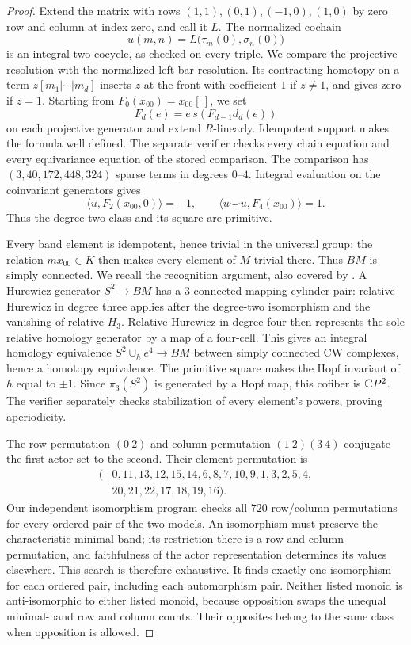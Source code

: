 \begin{proof}
Extend the matrix with rows $(1,1),(0,1),(-1,0),(1,0)$ by zero row and
column at index zero, and call it $L$. The normalized cochain
\[
u(m,n)=L\bigl(\tau_m(0),\sigma_n(0)\bigr)
\]
is an integral two-cocycle, as checked on every triple. We compare the
projective resolution with the normalized left bar resolution. Its
contracting homotopy on a term $z[m_1|\cdots|m_d]$ inserts $z$ at the
front with coefficient $1$ if $z\ne1$, and gives zero if $z=1$.
Starting from $F_0(x_{00})=x_{00}[\,]$, we set
\[
 F_d(e)=e\,s(F_{d-1}d_d(e))
\]
on each projective generator and extend $R$-linearly. Idempotent support
makes the formula well defined. The separate verifier checks every chain
equation and every equivariance equation of the stored comparison.
The comparison has $(3,40,172,448,324)$ sparse terms in degrees $0$--$4$.
Integral evaluation on the coinvariant generators gives
\[
\langle u,F_2(x_{00},0)\rangle=-1,
\qquad \langle u\smile u,F_4(x_{00})\rangle=1.
\]
Thus the degree-two class and its square are primitive.

Every band element is idempotent, hence trivial in the universal group;
the relation $mx_{00}\in K$ then makes every element of $M$ trivial there.
Thus $BM$ is simply connected. We recall the recognition argument, also
covered by \cite[Proposition~4C.3]{CP2-Hatcher2002}. A Hurewicz generator
$S^2\to BM$ has a $3$-connected mapping-cylinder pair: relative
Hurewicz in degree three applies after the degree-two isomorphism and
the vanishing of relative $H_3$. Relative Hurewicz in degree four then
represents the sole relative homology generator by a map of a four-cell.
This gives an integral homology equivalence
$S^2\cup_h e^4\to BM$ between simply connected CW complexes, hence a
homotopy equivalence. The primitive square makes the Hopf invariant of
$h$ equal to $\pm1$. Since $\pi_3(S^2)$ is generated by a Hopf map,
this cofiber is $\mathbb{C}P^2$. The verifier separately checks stabilization of
every element's powers, proving aperiodicity.

The row permutation $(0\ 2)$ and column permutation $(1\ 2)(3\ 4)$
conjugate the first actor set to the second. Their element permutation is
\[
\begin{split}
(&0,11,13,12,15,14,6,8,7,10,9,1,3,2,5,4,\\
 &20,21,22,17,18,19,16).
\end{split}
\]
Our independent isomorphism program checks all $720$ row/column
permutations for every ordered pair of the two models. An isomorphism
must preserve the characteristic minimal band; its restriction there is
a row and column permutation, and faithfulness of the actor representation
determines its values elsewhere. This search is therefore exhaustive. It
finds exactly one isomorphism for each ordered pair, including each
automorphism pair. Neither listed monoid is anti-isomorphic to either
listed monoid, because opposition swaps the unequal minimal-band row and
column counts. Their opposites belong to the same class when opposition
is allowed.
\end{proof}

